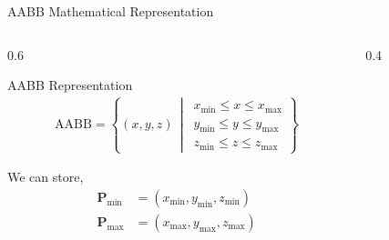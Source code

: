 \begin{frame}{AABB Mathematical Representation}
  \begin{columns}
    \begin{column}{0.6\textwidth}
      \begin{mathbox}{AABB Representation}
        \small
        \begin{align*}
          \text{AABB} = \left\{
            (x, y, z) \,\middle|\,
            \begin{array}{c}
              x_{\min} \leq x \leq x_{\max} \\
              y_{\min} \leq y \leq y_{\max} \\
              z_{\min} \leq z \leq z_{\max}
            \end{array}
          \right\}
        \end{align*}

        We can store,
        \begin{align*}
          \mathbf{P}_{\text{min}} &= (x_{\text{min}}, y_{\text{min}}, z_{\text{min}}) \\
          \mathbf{P}_{\text{max}} &= (x_{\text{max}}, y_{\text{max}}, z_{\text{max}}) \\
        \end{align*}
      \end{mathbox}
    \end{column}
    \begin{column}{0.4\textwidth}
\end{column}
\end{columns}
\end{frame}
